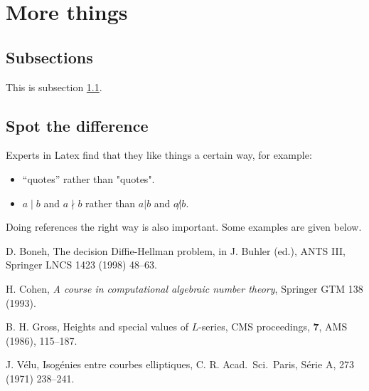 \section{More things}

\subsection{Subsections}
\label{sub-sec}

This is subsection \ref{sub-sec}.


\subsection{Spot the difference}


Experts in Latex find that they like things a certain way,
for example:
\begin{itemize}
\item ``quotes'' rather than "quotes".

\item $a \mid b$ and  $a \nmid b$ rather than
$a | b$ and $a \not| b$.

\end{itemize}


Doing references the right way is also important.
Some examples are given below. 


\begin{thebibliography}{}

 D. Boneh,
The decision Diffie-Hellman problem,
in J. Buhler (ed.), ANTS III, Springer LNCS 1423
(1998) 48--63.

 H. Cohen,
{\it A course in computational algebraic number theory},
Springer GTM 138 (1993).

 B. H. Gross,
Heights and special values of $L$-series, 
CMS proceedings, \textbf{7}, AMS (1986), 115--187.

 J. V\'elu,
Isog{\'e}nies entre courbes elliptiques,
C. R. Acad.\ Sci.\ Paris,
S{\'e}rie A, 273 (1971) 238--241.

\end{thebibliography}

